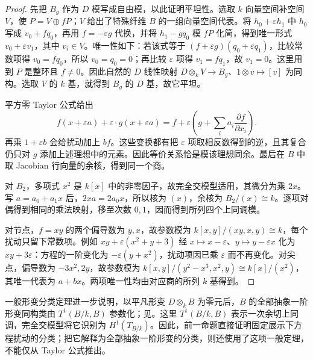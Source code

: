\begin{proof}
	先把 \(B_g\) 作为 \(D\) 模写成自由模，以此证明平坦性。选取 \(k\) 向量空间补空间 \(V\)，使 \(P=V\oplus fP\)；\(V\) 给出了特殊纤维 \(B\) 的一组向量空间代表。将 \(h_0+\varepsilon h_1\) 中 \(h_0\) 写成 \(v_0+fq_0\)，再用 \(f=-\varepsilon g\) 代换，并将 \(h_1-gq_0\) 模 \(fP\) 化简，得到唯一形式 \(v_0+\varepsilon v_1\)，其中 \(v_i\in V\)。唯一性如下：若该式等于 \((f+\varepsilon g)(q_0+\varepsilon q_1)\)，比较常数项得 \(v_0=fq_0\)，所以 \(v_0=q_0=0\)；再比较 \(\varepsilon\) 项得 \(v_1=fq_1\)，故 \(v_1=0\)。这里用到 \(P\) 是整环且 \(f\ne0\)。因此自然的 \(D\) 线性映射 \(D\otimes_kV\to B_g\)、\(1\otimes v\mapsto[v]\) 为同构。选取 \(V\) 的 \(k\) 基，就得到 \(B_g\) 的 \(D\) 基，故它平坦。

	平方零 Taylor 公式给出
	\[
		f(x+\varepsilon a)+\varepsilon\cdot g(x+\varepsilon a) =f+\varepsilon\left(g+\sum_i a_i\dfrac{\partial f}{\partial x_i}\right).
	\]
	再乘 \(1+\varepsilon b\) 会给扰动加上 \(bf\)。这些变换都有把 \(\varepsilon\) 项取相反数得到的逆，且其复合仍只对 \(g\) 添加上述理想中的元素。因此等价关系恰是模该理想同余。最后在 \(B\) 中取 Jacobian 行向量的余核，得到同一个商。

	对 \(B_2\)，多项式 \(x^2\) 是 \(k[x]\) 中的非零因子，故完全交模型适用，其微分为乘 \(2x\)。写 \(a=a_0+a_1x\) 后，\(2xa=2a_0x\)，所以核为 \((x)\)，余核为 \(B_2/(x)\cong k\)。逐项对偶得到相同的乘法映射，移至次数 \(0,1\)，因而得到所列四个上同调模。

	对节点，\(f=xy\) 的两个偏导数为 \(y,x\)，故参数模为 \(k[x,y]/(xy,x,y)\cong k\)，每个扰动只留下常数项。例如 \(xy+\varepsilon(x^2+y+3)\) 经 \(x\mapsto x-\varepsilon\)、\(y\mapsto y-\varepsilon x\) 化为 \(xy+3\varepsilon\)：方程的一阶变化为 \(-\varepsilon(y+x^2)\)，扰动项因已乘 \(\varepsilon\) 而不再变化。对尖点，偏导数为 \(-3x^2,2y\)，故参数模为 \(k[x,y]/(y^2-x^3,x^2,y)\cong k[x]/(x^2)\)，其唯一代表为 \(a+bx\)。两项唯一性均由对应商的所列 \(k\) 基得到。
\end{proof}

一般形变分类定理进一步说明，以平凡形变 \(D\otimes_kB\) 为零元后，\(B\) 的全部抽象一阶形变同构类由 \(T^1(B/k,B)\) 参数化；见\cite[Section 3.1, Lemma 3.1.2; Section 4.3, Theorem 4.3.3]{LichtenbaumSchlessinger1967CotangentComplex}。这里 \(T^1(B/k,B)\) 表示一次余切上同调，完全交模型将它识别为 \(H^1(T_{B/k})\)。因此，前一命题直接证明固定展示下方程扰动的分类；把它解释为全部抽象一阶形变的分类，则还使用了这项一般定理，不能仅从 Taylor 公式推出。

